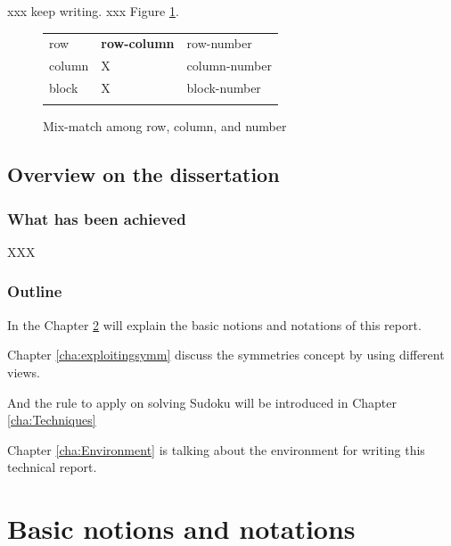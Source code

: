 \documentclass[11pt]{report}
\begin{document}
xxx keep writing. xxx
Figure \ref{fig:mixmatch}.

\begin{figure}[htbp]
\setlength{\tabcolsep}{3pt}
\renewcommand{\arraystretch}{2}
\begin{center}
\begin{tabular}{ >{\centering\arraybackslash}m{0.6in}| >{\centering\arraybackslash}m{1.1in}| >{\centering\arraybackslash}m{1.1in}|}
\multicolumn{1}{c}{} & \multicolumn{1}{c}{column} & \multicolumn{1}{c}{number}\\ \cline{2-3}
row & \textbf{row-column} & row-number\\ \cline{2-3}
column & X& column-number\\ \cline{2-3}
block & X & block-number \\ \cline{2-3}
\end{tabular}
\end{center}
\caption{Mix-match among row, column, and number}
\label{fig:mixmatch}
\end{figure}


\section{Overview on the dissertation}
\label{sec:overview}


\subsection{What has been achieved}
\label{sec:whatachieved}

XXX



\subsection{Outline}
\label{sec:Outline}

In the Chapter \ref{cha:basicnotnotat} will explain the basic notions and notations of this report.

Chapter \ref{cha:exploitingsymm} discuss the symmetries concept by using different views.

And the rule to apply on solving Sudoku will be introduced in Chapter \ref{cha:Techniques}

Chapter \ref{cha:Environment} is talking about the environment for writing this technical report.



\chapter{Basic notions and notations}
\label{cha:basicnotnotat}
\end{document}
